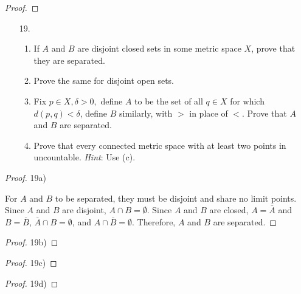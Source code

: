 \documentclass[10pt]{article}
\theoremstyle{definition}
\theoremstyle{plain}
\begin{document}
\begin{proof}

\end{proof}




\pagebreak




\begin{enumerate}
\item[19.]
\begin{enumerate}
\item If $A$ and $B$ are disjoint closed sets in some metric space $X$, prove that they are separated.
\item Prove the same for disjoint open sets.
\item Fix $p\in X, \delta >0,$ define $A$ to be the set of all $q\in X$ for which $d(p,q)<\delta$, define $B$ similarly, with $>$ in place of $<$. Prove that $A$ and $B$ are separated.
\item Prove that every connected metric space with at least two points in uncountable. \textit{Hint}: Use (c).
\end{enumerate}
\end{enumerate}

\begin{proof}
19a)

For $A$ and $B$ to be separated, they must be disjoint and share no limit points. Since $A$ and $B$ are disjoint, $A\cap B=\emptyset$. Since $A$ and $B$ are closed, $A=\overline{A}$ and $B=\overline{B}$, $\overline{A}\cap B=\emptyset$, and $A\cap\overline{B}=\emptyset$. Therefore, $A$ and $B$ are separated.
\end{proof}

\begin{proof}
19b)


\end{proof}


\begin{proof}
19c)


\end{proof}


\begin{proof}
19d)


\end{proof}
\end{document}
